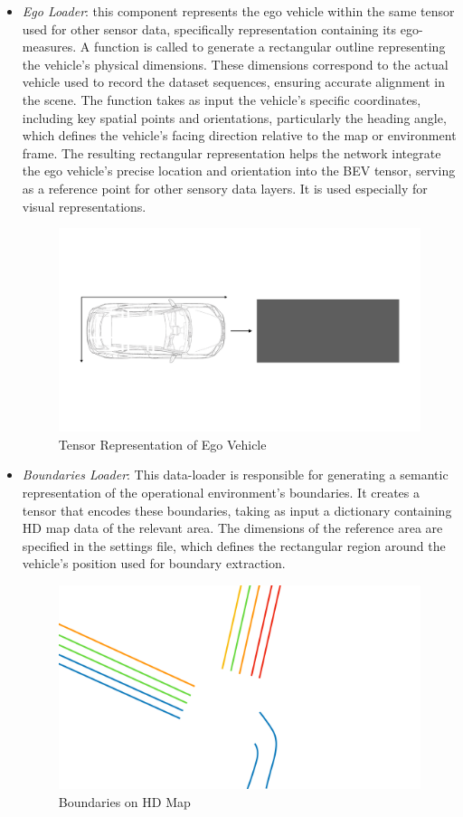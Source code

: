 \begin{itemize}
    \item \textit{Ego Loader}: this component represents the ego vehicle within the same tensor used for other sensor data, specifically representation containing its ego-measures. A function is called to generate a rectangular outline representing the vehicle's physical dimensions. These dimensions correspond to the actual vehicle used to record the dataset sequences, ensuring accurate alignment in the scene. 
    The function takes as input the vehicle's specific coordinates, including key spatial points and orientations, particularly the heading angle, which defines the vehicle's facing direction relative to the map or environment frame. The resulting rectangular representation helps the network integrate the ego vehicle's precise location and orientation into the BEV tensor, serving as a reference point for other sensory data layers.
    It is used especially for visual representations. 
    \begin{figure}[H]
        \centering
        \includegraphics[width=0.75\linewidth]{LateX//figs/egoLoader.pdf}
        \caption{Tensor Representation of Ego Vehicle}
        \label{fig:ego-loader}
    \end{figure}

    \item \textit{Boundaries Loader}: This data-loader is responsible for generating a semantic representation of the operational environment's boundaries. It creates a tensor that encodes these boundaries, taking as input a dictionary containing HD map data of the relevant area. The dimensions of the reference area are specified in the settings file, which defines the rectangular region around the vehicle’s position used for boundary extraction.
    
    \begin{figure}[H]
        \centering
        \includegraphics[width=0.75\linewidth]{LateX//figs/mappaHD.pdf}
        \caption{Boundaries on HD Map}
        \label{fig:hd-map-boundaries}
    \end{figure}
    

\end{itemize}
